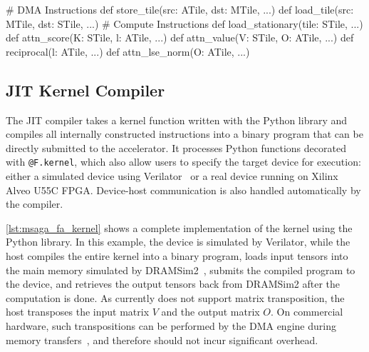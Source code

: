 \begin{listing}
\begin{mintedpython}
# DMA Instructions
def store_tile(src: ATile, dst: MTile, ...)
def load_tile(src: MTile, dst: STile, ...)
# Compute Instructions
def load_stationary(tile: STile, ...)
def attn_score(K: STile, l: ATile, ...)
def attn_value(V: STile, O: ATile, ...)
def reciprocal(l: ATile, ...)
def attn_lse_norm(O: ATile, ...)
\end{mintedpython}
\caption{\MSAGA{} Python instructions.}
\label{lst:msaga_api}
\end{listing}

\subsection{JIT Kernel Compiler}

The JIT compiler takes a kernel function written with the \MSAGA{} Python 
library and compiles all internally constructed \MSAGA{} instructions into a 
binary program that can be directly submitted to the \MSAGA{} accelerator.
It processes Python functions decorated with \texttt{@F.kernel}, which also
allow users to specify the target device for execution: either a simulated device using 
Verilator~\cite{verilator} or a real device running on Xilinx Alveo U55C FPGA.
Device-host communication is also handled automatically by the compiler.


\autoref{lst:msaga_fa_kernel} shows a complete implementation of the \SA{} kernel using the Python library.
In this example, the device is simulated by Verilator, while the host compiles the entire kernel into a binary program,
loads input tensors into the main memory simulated by DRAMSim2~\cite{dramsim2},
submits the compiled program to the device, and retrieves the output tensors back from DRAMSim2 after the computation is done.
As \MSAGA{} currently does not support matrix transposition,
the host transposes the input matrix $V$ and the output matrix $O$.
On commercial hardware, such transpositions can be performed by the DMA engine 
during memory transfers~\cite{aws_neuron_nki}, and therefore should not incur 
significant overhead.

